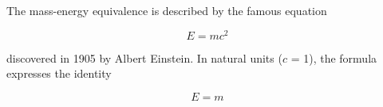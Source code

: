 The mass-energy equivalence is described by the famous equation
 
$$E=mc^2$$
 
discovered in 1905 by Albert Einstein. 
In natural units ($c$ = 1), the formula expresses the identity
 
\begin{equation}
E=m
\end{equation}
